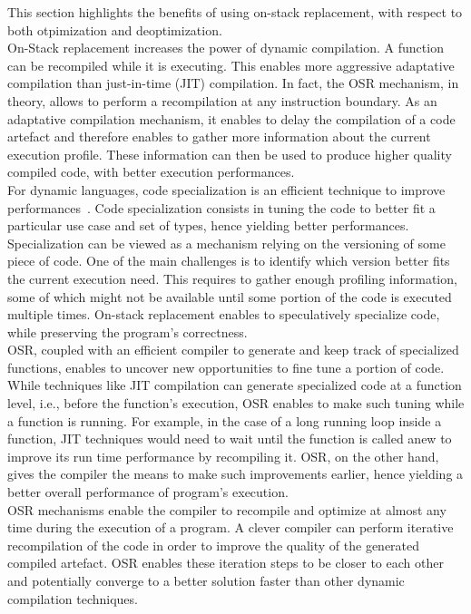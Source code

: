 This section highlights the benefits of using on-stack replacement, with respect to both otpimization and deoptimization.\\

On-Stack replacement increases the power of dynamic compilation.
A function can be recompiled while it is executing.
This enables more aggressive adaptative compilation than just-in-time (JIT) compilation.
In fact, the OSR mechanism, in theory, allows to perform a recompilation at any instruction boundary. 
As an adaptative compilation mechanism, it enables to delay the compilation of a code artefact and therefore enables to gather more information about the current execution profile.
These information can then be used to produce higher quality compiled code, with better execution performances.\\

For dynamic languages, code specialization is an efficient technique to improve performances~\cite{gal2009trace}.
Code specialization consists in tuning the code to better fit a particular use case and set of types, hence yielding better performances.
Specialization can be viewed as a mechanism relying on the versioning of some piece of code.
One of the main challenges is to identify which version better fits the current execution need.
This requires to gather enough profiling information, some of which might not be available until some portion of the code is executed multiple times.
On-stack replacement enables to speculatively specialize code, while preserving the program's correctness.\\

OSR, coupled with an efficient compiler to generate and keep track of specialized functions, enables to uncover new opportunities to fine tune a portion of code.
While techniques like JIT compilation can generate specialized code at a function level, i.e., before the function's execution, OSR enables to make such tuning while a function is running.
For example, in the case of a long running loop inside a function, JIT techniques would need to wait until the function is called anew to improve its run time performance by recompiling it. 
OSR, on the other hand, gives the compiler the means to make such improvements earlier, hence yielding a better overall performance of program's execution.\\

OSR mechanisms enable the compiler to recompile and optimize at almost any time during the execution of a program.
A clever compiler can perform iterative recompilation of the code in order to improve the quality of the generated compiled artefact.
OSR enables these iteration steps to be closer to each other and potentially converge to a better solution faster than other dynamic compilation techniques.\\

